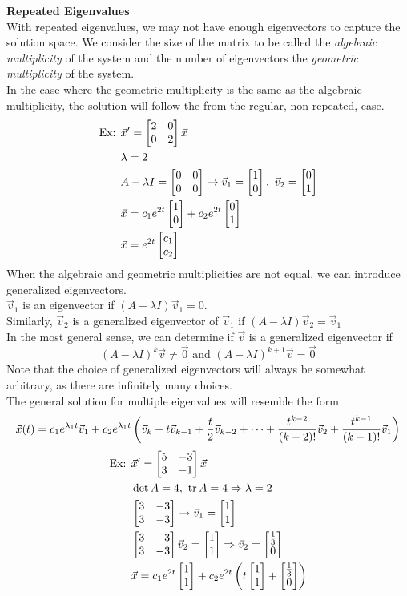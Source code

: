 \documentclass[11pt, fleqn]{article}
\begin{document}
\textbf{Repeated Eigenvalues}\\
With repeated eigenvalues, we may not have enough eigenvectors to capture the solution space. We consider the size of the matrix to be called the \textit{algebraic multiplicity} of the system and the number of eigenvectors the \textit{geometric multiplicity} of the system.\\
In the case where the geometric multiplicity is the same as the algebraic multiplicity, the solution will follow the from the regular, non-repeated, case.
\begin{align*}
    \text{Ex: }&\vec{x}'=\matrixx{2&0\\0&2}\vec{x}\\
    &\lambda=2\\
    &A-\lambda I=\matrixx{0&0\\0&0}\to\vec{v}_1=\matrixx{1\\0},\ \vec{v}_2=\matrixx{0\\1}\\
    &\vec{x}=c_1e^{2t}\matrixx{1\\0}+c_2e^{2t}\matrixx{0\\1}\\
    &\vec{x}=e^{2t}\matrixx{c_1\\c_2}
\end{align*}
When the algebraic and geometric multiplicities are not equal, we can introduce generalized eigenvectors.\\
$\vec{v}_1$ is an eigenvector if $(A-\lambda I)\vec{v}_1=0$.\\
Similarly, $\vec{v}_2$ is a generalized eigenvector of $\vec{v}_1$ if $(A-\lambda I)\vec{v}_2=\vec{v}_1$\\
In the most general sense, we can determine if $\vec{v}$ is a generalized eigenvector if
$$(A-\lambda I)^k\vec{v}\neq\vec{0}\text{ and }(A-\lambda I)^{k+1}\vec{v}=\vec{0}$$
Note that the choice of generalized eigenvectors will always be somewhat arbitrary, as there are infinitely many choices.\\
The general solution for multiple eigenvalues will resemble the form
$$\vec{x}(t)=c_1e^{\lambda_1 t}\vec{v}_1+c_2e^{\lambda_1 t}\left( \vec{v}_k+t\vec{v}_{k-1}+\frac{t}{2}\vec{v}_{k-2}+\cdots+\frac{t^{k-2}}{(k-2)!}\vec{v}_2+\frac{t^{k-1}}{(k-1)!}\vec{v}_1 \right)$$
\begin{align*}
    \text{Ex: }&\vec{x}'=\matrixx{5&-3\\3&-1}\vec{x}\\
    &\det A=4,\ \trace A=4\Ra \lambda=2\\
    &\matrixx{3&-3\\3&-3}\to\vec{v}_1=\matrixx{1\\1}\\
    &\matrixx{3&-3\\3&-3}\vec{v}_2=\matrixx{1\\1}\Ra\vec{v}_2=\matrixx{\frac{1}{3}\\0}\\
    &\vec{x}=c_1e^{2t}\matrixx{1\\1}+c_2e^{2t}\brround{t\matrixx{1\\1}+\matrixx{\frac{1}{3}\\0}}
\end{align*}
\end{document}
